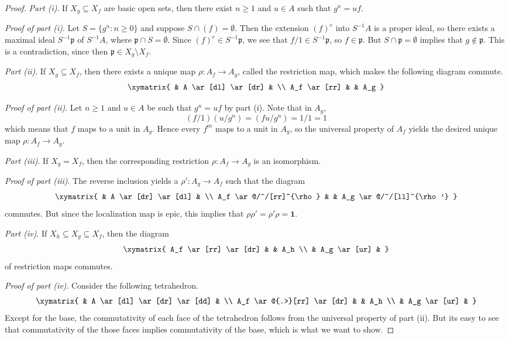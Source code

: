 \begin{proof} \mbox{}

\emph{Part (i)}. If $ X_g \subseteq X_f$ are basic open sets, then there exist $ n \geq 1$ and $ u \in A$ such that $ g^n = uf$.

\emph{Proof of part (i)}. Let $ S = \{g^n : n \geq 0\}$ and suppose $ S \cap (f) = \emptyset$. Then the extension $ (f)^e$ into $ S^{-1}A$ is a proper ideal, so there exists a maximal ideal $ S^{-1}\mathfrak{p}$ of $ S^{-1}A$, where $ \mathfrak{p} \cap S = \emptyset$. Since $ (f)^e \in S^{-1}\mathfrak{p}$, we see that $ f/1 \in S^{-1}\mathfrak{p}$, so $ f \in \mathfrak{p}$. But $ S \cap \mathfrak{p} = \emptyset$ implies that $ g \notin \mathfrak{p}$. This is a contradiction, since then $ \mathfrak{p} \in X_g \setminus X_f$.

\emph{Part (ii)}. If $ X_g \subseteq X_f$, then there exists a unique map $ \rho : A_f \to A_g$, called the restriction map, which makes the following diagram commute.
\[ \xymatrix{ & A \ar[dl] \ar[dr] & \\ A_f \ar[rr] & & A_g } \]

\emph{Proof of part (ii)}. 
Let $ n \geq 1$ and $ u \in A$ be such that $ g^n = uf$ by part (i). Note that in $ A_g$,
\[ (f/1)(u/g^n) = (fu/g^n) = 1/1 = 1 \]
which means that $ f$ maps to a unit in $ A_g$. Hence every $ f^m$ maps to a unit in $ A_g$, so the universal property of $ A_f$ yields the desired unique map $ \rho : A_f \to A_g$.

\emph{Part (iii)}. 
If $ X_g = X_f$, then the corresponding restriction $ \rho : A_f \to A_g$ is an isomorphism.

\emph{Proof of part (iii)}. 
The reverse inclusion yields a $ \rho' : A_g \to A_f$ such that the diagram
\[ \xymatrix{
& A \ar[dr] \ar[dl] & \\
A_f \ar@/^/[rr]^{\rho} & & A_g \ar@/^/[ll]^{\rho'}
} \]
commutes. But since the localization map is epic, this implies that $ \rho \rho' = \rho' \rho = \mathbf{1}$.

\emph{Part (iv)}.
If $ X_h \subseteq X_g \subseteq X_f$, then the diagram
\[ \xymatrix{
A_f \ar[rr] \ar[dr] & & A_h \\
& A_g \ar[ur] &
} \]
of restriction maps commutes.

\emph{Proof of part (iv)}.
Consider the following tetrahedron.
\[ \xymatrix{
& A \ar[dl] \ar[dr] \ar[dd] & \\
A_f \ar@{.>}[rr] \ar[dr] & & A_h \\
& A_g \ar[ur] &
} \]
Except for the base, the commutativity of each face of the tetrahedron follows from the universal property of part (ii). But its easy to see that commutativity of the those faces implies commutativity of the base, which is what we want to show.


\end{proof}
